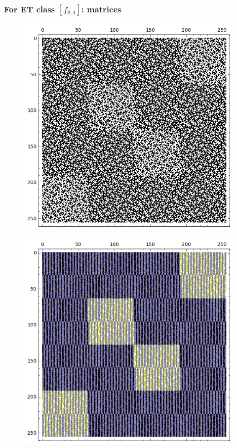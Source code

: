 \documentclass[pdf,sprung,slideColor,nocolorBG]{beamer}
\newenvironment{colortheme}[1]{
\def\ProvidesPackageRCS $##1${\relax}
\renewcommand{\ProcessOptions}{\relax}
\makeatletter

\makeatother
}{}
\begin{document}
\begin{colortheme}{jubata}
\begin{frame}
\begin{figure}
\begin{minipage}{.48\textwidth}
  \label{fig:8_3_bent_cayley_graph_index_matrix}
\end{minipage}
\end{figure}
~
\end{frame}
\begin{frame}
\frametitle{For ET class $[f_{8,4}]$: matrices}
\begin{figure}
\centering
\begin{minipage}{.48\textwidth}
  \centering
  \includegraphics[width=.9\linewidth]{../matrix_plot/c8_4_weight_class_matrix.png}
  \label{fig:8_4_weight_class_matrix}
\end{minipage}%
\begin{minipage}{.48\textwidth}
  \centering
  \includegraphics[width=.9\linewidth]{../matrix_plot/c8_4_bent_cayley_graph_index_matrix.png}

\end{minipage}
\end{figure}
\end{frame}
\end{colortheme}
\end{document}
